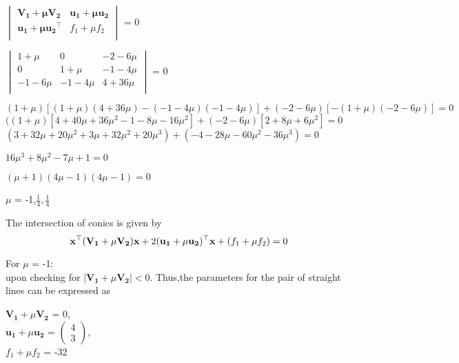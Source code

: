\documentclass[journal,12pt,twocolumn]{IEEEtran}
\newcommand{\myvec}[1]{\ensuremath{\begin{pmatrix}#1\end{pmatrix}}}
\let\vec\mathbf
\begin{document}
\begin{center}
$\begin{vmatrix}
\vec{V_1+\mu V_2} & \vec{u_1+\mu u_2} \\ 
\vec{u_1+\mu u_2}^\top & f_1+\mu f_2 \\
\end{vmatrix}$ = 0
\end{center}

\begin{center}
$\begin{vmatrix}
{1+\mu} & 0 & {-2-6\mu} \\ 
0 & {1+\mu} & {-1-4\mu} \\
{-1-6\mu} & {-1-4\mu} & {4+36\mu} \\
\end{vmatrix}$ = 0
\end{center} 

${(1+\mu)}[(1+\mu)(4+36\mu)-(-1-4\mu)(-1-4\mu)]+(-2-6\mu)[-(1+\mu)(-2-6\mu)]=0$ \\

$((1+\mu)[4+40\mu+36\mu^2-1-8\mu-16\mu^2]+(-2-6\mu)[2+8\mu+6\mu^2] = 0$ \\

$(3+32\mu+20\mu^2+3\mu+32\mu^2+20\mu^3)+(-4-28\mu-60\mu^2-36\mu^3) = 0$ 

\begin{center}
$16\mu^3+8\mu^2-7\mu+1 = 0$ \\
\end{center}

$(\mu+1)(4\mu-1)(4\mu-1) = 0$
\begin{center}
$\mu$ = -1,$\frac{1}{4},\frac{1}{4}$\\
\end{center}

The intersection of conics is given by
\begin{equation}
{\vec{x^{\top}{(V_1+\mu V_2)}x}+2\vec{(u_1+\mu u_2)^{\top}x}+(f_1+\mu f_2)}=0\\
\end{equation}


For $\mu$ = -1:\\
upon checking for $|\vec{V_1}+\mu\vec{V_2}|<0$. Thus,the parameters for the pair of straight lines can be expressed as \\
\begin{center}
$\vec{V_1}+\mu\vec{V_2}$ = 0, \\ 
$\vec{u_1}+\mu\vec{u_2}$ = $\myvec{4 \\ 3}$,\\
${f_1+\mu f_2}$ = -32 
\end{center} 
\end{document}
